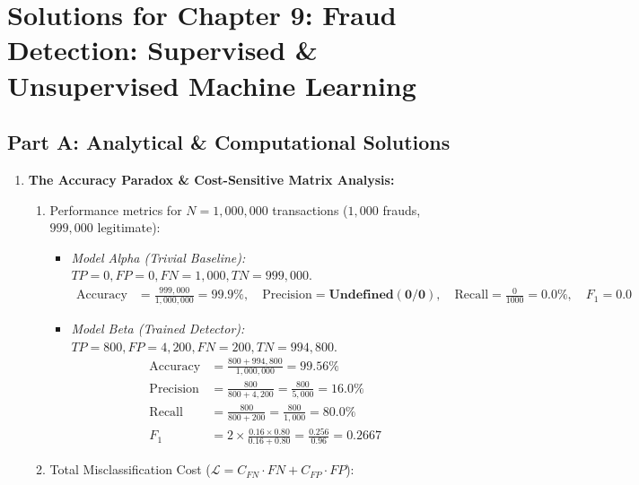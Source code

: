 \newpage
\section*{Solutions for Chapter 9: Fraud Detection: Supervised \& Unsupervised Machine Learning}

\subsection*{Part A: Analytical \& Computational Solutions}

\begin{enumerate}[label=\textbf{P9.\arabic*}]
    \item \textbf{The Accuracy Paradox \& Cost-Sensitive Matrix Analysis:}
    \begin{enumerate}[label=(\alph*)]
        \item Performance metrics for $N = 1{,}000{,}000$ transactions ($1{,}000$ frauds, $999{,}000$ legitimate):
        \begin{itemize}
            \item \textit{Model Alpha (Trivial Baseline):} $TP = 0, FP = 0, FN = 1{,}000, TN = 999{,}000$.
            \begin{align*}
            \text{Accuracy} &= \frac{999{,}000}{1{,}000{,}000} = \mathbf{99.9\%}, \quad \text{Precision} = \mathbf{\text{Undefined} (0/0)}, \quad \text{Recall} = \frac{0}{1000} = \mathbf{0.0\%}, \quad F_1 = \mathbf{0.0}
            \end{align*}
            \item \textit{Model Beta (Trained Detector):} $TP = 800, FP = 4{,}200, FN = 200, TN = 994{,}800$.
            \begin{align*}
            \text{Accuracy} &= \frac{800 + 994{,}800}{1{,}000{,}000} = \mathbf{99.56\%} \\
            \text{Precision} &= \frac{800}{800 + 4{,}200} = \frac{800}{5{,}000} = \mathbf{16.0\%} \\
            \text{Recall} &= \frac{800}{800 + 200} = \frac{800}{1{,}000} = \mathbf{80.0\%} \\
            F_1 &= 2 \times \frac{0.16 \times 0.80}{0.16 + 0.80} = \frac{0.256}{0.96} = \mathbf{0.2667}
            \end{align*}
        \end{itemize}
        \item Total Misclassification Cost ($\mathcal{L} = C_{FN} \cdot FN + C_{FP} \cdot FP$):

\end{enumerate}
\end{enumerate}
